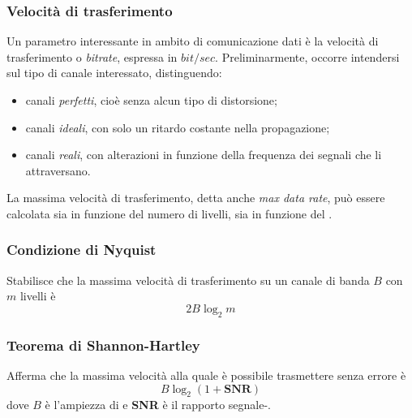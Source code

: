 \documentclass[a4paper,11pt]{article}
\def\subsub#1{\subsubsection{#1}\label{#1}}
\def\vedi#1{\nameref{#1}}
\begin{document}
\subsubsection{Velocità di trasferimento}
Un parametro interessante in ambito di comunicazione dati è la velocità di trasferimento o \textit{bitrate}, espressa in $bit/sec$. Preliminarmente, occorre intendersi sul tipo di canale interessato, distinguendo:
\begin{itemize}
\item canali \textit{perfetti}, cioè senza alcun tipo di distorsione;
\item canali \textit{ideali}, con solo un ritardo costante nella propagazione;
\item canali \textit{reali}, con alterazioni in funzione della frequenza dei segnali che li attraversano.
\end{itemize}
La massima velocità di trasferimento, detta anche \textit{max data rate}, può essere calcolata sia in funzione del numero di livelli, sia in funzione del \vedi{Rumore}.
\subsub{Condizione di Nyquist}
Stabilisce che la massima velocità di trasferimento su un canale di banda $B$ con $m$ livelli è
\[2B\log_{2}m\]

\subsub{Teorema di Shannon-Hartley}
Afferma che la massima velocità alla quale è possibile trasmettere senza errore è
\[B\log_{2}(1+\textbf{SNR})\]
dove $B$ è l'ampiezza di \vedi{Banda} e \textbf{SNR} è il rapporto segnale-\vedi{Rumore}.
\end{document}
